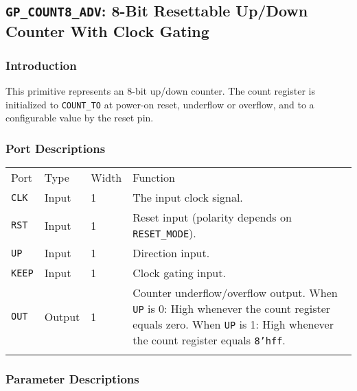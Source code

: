 \documentclass[11pt]{article}
\newcommand{\tokenstyle}[1]{\texttt{#1}}
\newcommand{\datastyle}[1]{\texttt{#1}}
\newcommand{\whenstyle}[1]{{\fontseries{sb}\selectfont#1}}
\newcommand{\thinhline}{\Xhline{1\arrayrulewidth}}
\newcommand{\thickhline}{\Xhline{2.5\arrayrulewidth}}
\begin{document}

\pagebreak
\subsection{\tokenstyle{GP\_COUNT8\_ADV}: 8-Bit Resettable Up/Down Counter With Clock Gating}
\label{gp-count8-adv}

\subsubsection{Introduction}
This primitive represents an 8-bit up/down counter. The count register is initialized to \tokenstyle{COUNT\_TO} at
power-on reset, underflow or overflow, and to a configurable value by the reset pin.

\subsubsection{Port Descriptions}

\begin{tabularx}{\textwidth}{lllX}
\thinhline
\whenstyle{Port} & \whenstyle{Type} & \whenstyle{Width} & \whenstyle{Function} \\
\thickhline
\tokenstyle{CLK} & Input & 1 & The input clock signal. \\
\thinhline
\tokenstyle{RST} & Input & 1 & Reset input (polarity depends on \tokenstyle{RESET\_MODE}). \\
\thinhline
\tokenstyle{UP} & Input & 1 & Direction input. \\
\thinhline
\tokenstyle{KEEP} & Input & 1 & Clock gating input. \\
\thinhline
\tokenstyle{OUT} & Output & 1 & Counter underflow/overflow output. \newline
	\whenstyle{When \tokenstyle{UP} is 0:} High whenever the count register equals zero. \newline
	\whenstyle{When \tokenstyle{UP} is 1:} High whenever the count register equals \datastyle{8'hff}. \\
\thinhline
\end{tabularx}

\subsubsection{Parameter Descriptions}
\end{document}
